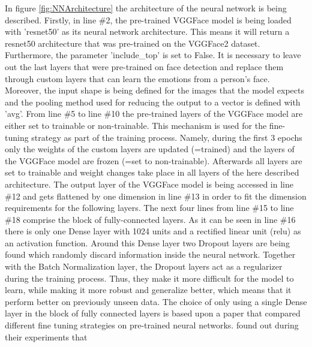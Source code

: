 In figure \ref{fig:NNArchitecture} the architecture of the neural network is being described. Firstly, in line \#2, the pre-trained VGGFace model is being loaded with 'resnet50' as its neural network architecture. This means it will return a resnet50 architecture that was pre-trained on the VGGFace2 dataset. Furthermore, the parameter 'include\_top' is set to False. It is necessary to leave out the last layers that were pre-trained on face detection and replace them through custom layers that can learn the emotions from a person's face. Moreover, the input shape is being defined for the images that the model expects and the pooling method used for reducing the output to a vector is defined with 'avg'.
\newline\newline
From line \#5 to line \#10 the pre-trained layers of the VGGFace model are either set to trainable or non-trainable. This mechanism is used for the fine-tuning strategy as part of the training process. Namely, during the first 3 epochs only the weights of the custom layers are updated (=trained) and the layers of the VGGFace model are frozen (=set to non-trainable). Afterwards all layers are set to trainable and weight changes take place in all layers of the here described architecture.
\newline\newline
The output layer of the VGGFace model is being accessed in line \#12 and gets flattened by one dimension in line \#13 in order to fit the dimension requirements for the following layers. 
\newline\newline
The next four lines from line \#15 to line \#18 comprise the block of fully-connected layers. As it can be seen in line \#16 there is only one Dense layer with 1024 units and a rectified linear unit (relu) as an activation function. Around this Dense layer two Dropout layers are being found which randomly discard information inside the neural network. Together with the Batch Normalization layer, the Dropout layers act as a regularizer during the training process. Thus, they make it more difficult for the model to learn, while making it more robust and generalize better, which means that it perform better on previously unseen data.
\newline\newline
The choice of only using a single Dense layer in the block of fully connected layers is based upon a paper \citep{Pittaras:2017:FineTuningStrategiesComparison} that compared different fine tuning strategies on pre-trained neural networks. \citet{Pittaras:2017:FineTuningStrategiesComparison} found out during their experiments that

